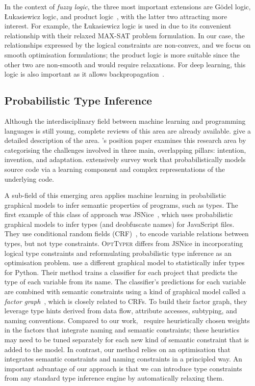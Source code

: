 \documentclass[acmsmall, review, anonymous]{acmart}\settopmatter{printfolios=true,printccs=false,printacmref=false}
\newcommand{\projectname}{\textsc{OptTyper}\xspace}
\begin{document}
In the context of \textit{fuzzy logic}, the three most
important extensions are G{\"o}del logic, {\L}ukasiewicz logic, and product logic~\cite{hajek98}, with the latter two attracting more interest. For example, the {\L}ukasiewicz logic is used in \citet{bach17} due 
to its convenient relationship with their relaxed MAX-SAT problem formulation. In our case, the relationships expressed by the logical constraints are non-convex, and we focus on smooth optimisation formulations; the product logic is more
suitable since the other two are non-smooth and 
would require relaxations. For 
deep learning, this logic is also important as it 
allows backpropagation~\cite{evans18}.


\subsection{Probabilistic Type Inference}\label{sec:ml:over:source}

Although the interdisciplinary field between machine learning and programming
languages is still young, complete reviews of this area are
already available.
\citet{vechev16} give a detailed description of the area.
\citet{threepillars}'s position paper examines this research area by categorising
the challenges involved in three main, overlapping pillars: intention, invention, and adaptation.
\citet{allamanis17} extensively survey work that probabilistically models source code via a learning component and complex representations of the underlying code.

A sub-field of this emerging area applies machine learning in probabilistic graphical models to infer semantic properties of programs, such as types.
The first example of this class
of approach was
JSNice~\citep{raychev15}, which uses probabilistic graphical models to infer types (and deobfuscate names) for JavaScript files. 
They use conditional random fields (CRF)~\cite{sutton12}, to encode variable relations between types, but not type constraints. 
\projectname differs from JSNice in incorporating logical type constraints and reformulating  probabilistic type inference as an optimisation problem.
\citet{xu16} use a different  graphical model to statistically infer types for Python. 
Their method trains a
classifier for each project that predicts the
type of each variable from its name.
The classifier's predictions for each variable are combined with semantic constraints using a kind of graphical model called a \emph{factor graph}~\citep{yedidia2003}, which is
closely related to CRFs.
To build their factor graph, they leverage type hints
derived from data flow, attribute accesses, subtyping, and naming conventions. Compared to our work,~\citet{xu16} require
heuristically chosen weights in the factors that integrate naming and semantic constraints; these heuristics may need to be tuned separately for each new kind of semantic constraint that is added to the model. In contrast, our method relies on an optimisation that integrates semantic constraints
and naming constraints in a principled way.
An important advantage of our approach
is that we can introduce type constraints from any standard type inference engine by automatically relaxing them.
\end{document}
